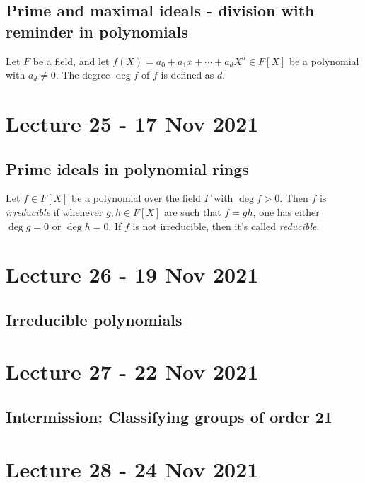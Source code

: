 \documentclass[11pt]{scrartcl}
\begin{document}
\subsection{Prime and maximal ideals - division with reminder in polynomials}

\begin{definition}
  Let $F$ be a field, and let $f(X)=a_0+a_1x+\cdots + a_d X^d\in F[X]$ be a polynomial
  with $a_d\neq 0$. The degree $\deg f$ of $f$ is defined as $d$.
  \label{<+label+>}
\end{definition}

\section{Lecture 25 - 17 Nov 2021 }

\subsection{Prime ideals in polynomial rings}

\begin{definition}
  Let $f\in F[X]$ be a polynomial over the field $F$ with $\deg f>0$. Then $f$ is
  \emph{irreducible} if whenever $g,h\in F[X]$ are such that $f=gh$, one has either $\deg
  g=0$ or $\deg h=0$. If $f$ is not irreducible, then it's called \emph{reducible}.
\end{definition}

\section{Lecture 26 - 19 Nov 2021}

\subsection{Irreducible polynomials}

\section{Lecture 27 - 22 Nov 2021}

\subsection{Intermission: Classifying groups of order 21}

\section{Lecture 28 - 24 Nov 2021}
\end{document}
